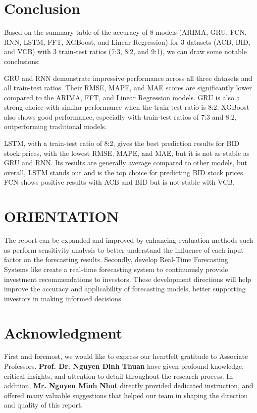 \documentclass{ieeeojies}
\begin{document}
\section{Conclusion}
Based on the summary table of the accuracy of 8 models (ARIMA, GRU, FCN, RNN, LSTM, FFT, XGBoost, and Linear Regression) for 3 datasets (ACB, BID, and VCB) with 3 train-test ratios (7:3, 8:2, and 9:1), we can draw some notable conclusions:

GRU and RNN demonstrate impressive performance across all three datasets and all train-test ratios. Their RMSE, MAPE, and MAE scores are significantly lower compared to the ARIMA, FFT, and Linear Regression models. GRU is also a strong choice with similar performance when the train-test ratio is 8:2. XGBoost also shows good performance, especially with train-test ratios of 7:3 and 8:2, outperforming traditional models.

LSTM, with a train-test ratio of 8:2, gives the best prediction results for BID stock prices, with the lowest RMSE, MAPE, and MAE, but it is not as stable as GRU and RNN. Its results are generally average compared to other models, but overall, LSTM stands out and is the top choice for predicting BID stock prices. FCN shows positive results with ACB and BID but is not stable with VCB.
\section{ORIENTATION}
The report can be expanded and improved by enhancing evaluation methods such as  perform sensitivity analysis to better understand the influence of each input factor on the forecasting results. Secondly, develop Real-Time Forecasting Systems like create a real-time forecasting system to continuously provide investment recommendations to investors. These development directions will help improve the accuracy and applicability of forecasting models, better supporting investors in making informed decisions.

\section{Acknowledgment}
First and foremost, we would like to express our heartfelt gratitude to Associate Professors. \textbf{Prof. Dr. Nguyen Dinh Thuan} have given profound knowledge, critical insights, and attention to detail throughout the research
 process. In addition, \textbf{Mr. Nguyen Minh Nhut} directly provided dedicated instruction, and offered many valuable suggestions that helped our team in shaping the direction and quality of this report.
\end{document}
